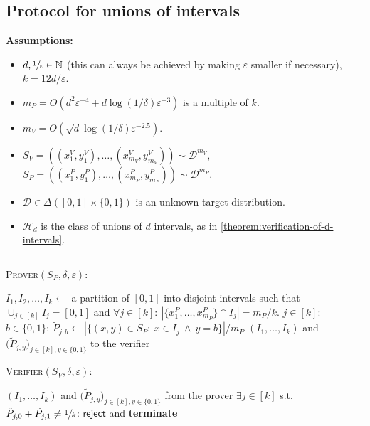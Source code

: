 \documentclass[11pt]{article}
\numberwithin{equation}{section}
\theoremstyle{definition}
\theoremstyle{plain}
\theoremstyle{definition}\newtheorem{notation}[theorem]{Notation}\theoremstyle{plain}\raggedbottom
\newcommand{\roundBrackets}[1]{
	\mathopen{}\left(#1\right)\mathclose{}
}
\newcommand{\vsp}{\vspace{0.5em}}
\newcommand{\BigO}[1]{O\roundBrackets{#1}}
\newcommand{\distribution}[1]{\Delta\roundBrackets{#1}}
\newcommand{\reject}{\mathsf{reject}}
\newcommand{\bbN}{\mathbb{N}}
\newcommand{\cD}{\mathcal{D}}
\newcommand{\cH}{\mathcal{H}}
\newcommand{\1}{\mathds{1}}
\newcommand{\mP}{m_{\scriptscriptstyle P}}
\newcommand{\mV}{m_{\scriptscriptstyle V}}
\newenvironment{ShadedAlgorithmBox}{\begin{tcolorbox}[colback=myLipicsLightGray,colframe=myLipicsLightGray,arc=-1pt]\begin{minipage}{0.975\textwidth}}{\end{minipage}\end{tcolorbox}}
\begin{document}
\begin{minipage}{\textwidth}
\subsection{Protocol for unions of intervals}\label{appendix:union-of-intervals}

\vspace{-0.25cm}
\begin{protocol}[H]
	\begin{ShadedAlgorithmBox}
		{\bfseries Assumptions:} 
		\begin{itemize}	
			\item{$d,\sfrac{1}{\varepsilon} \in \bbN$ (this can always be achieved by making $\varepsilon$ smaller if necessary), $k = 12d/\varepsilon$.}
				\item{$\mP = \BigO{d^2\varepsilon^{-4}	+ d\log(1/\delta)\varepsilon^{-3}}$ is a multiple of $k$.}
				\item{$\mV = \BigO{\sqrt{d}\log(1/\delta)\varepsilon^{-2.5}}$.}
			\item{
				$S_V = ((x_1^V,y_1^V),\dots,(x_{\mV}^V,y_{\mV}^V)) \sim \cD^{\mV}$, $S_P = ((x_1^P,y_1^P),\dots,(x_{\mP}^P,y_{\mP}^P)) \sim \cD^{\mP}$.
			}
			\item{
				$\cD \in \distribution{[0,1]\times \{0,1\}}$ is an unknown target distribution.
			}
			\item{
				$\cH_d$ is the class of unions of $d$ intervals, as in \cref{theorem:verification-of-d-intervals}.
			}
		\end{itemize}

		\noindent\rule{\textwidth}{0.5pt}

		\vsp

		\textsc{Prover}$(S_P,\delta,\varepsilon)$:
		\begin{algorithmic}
			\State $I_1,I_2,\dots,I_k \gets$ a partition of $[0,1]$ into disjoint intervals such that $\cup_{j \in [k]} I_j = [0,1]$
			\State \hfil and $\forall j \in [k]: ~ |\{x_1^P,\dots,x_{\mP}^P\}\cap I_j| = \mP/k$. \hfil
			\vsp
			\For $j \in [k]$:
				\For $b \in \{0,1\}$:
					\State $\tilde{P}_{j,b} \gets |\{(x,y) \in S_P: ~ x \in I_j ~ \land ~ y = b\}| / \mP$
				\EndFor
			\EndFor
			 $\left(I_1,\dots,I_k\right)$ and $\big(\tilde{P}_{j,y}\big)_{j \in [k], y \in \{0,1\}}$ to the verifier
		\end{algorithmic}

		\vsp

		\textsc{Verifier}$(S_V,\delta,\varepsilon)$:	
		\begin{algorithmic}
			 $\left(I_1,\dots,I_k\right)$ and $\big(\tilde{P}_{j,y}\big)_{j \in [k], y \in \{0,1\}}$ from the prover
			\vsp
			\If $\exists j \in [k]$ s.t. $\tilde{P}_{j,0} + \tilde{P}_{j,1} \neq \sfrac{1}{k}$:
				 $\reject$ and {\bfseries terminate} 
			\EndIf


\end{algorithmic}
\end{ShadedAlgorithmBox}
\end{protocol}
\end{minipage}
\end{document}
